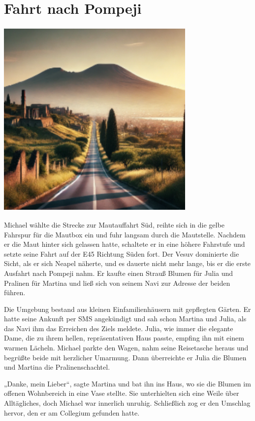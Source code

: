 \documentclass[
]{article}
\begin{document}
\section{Fahrt nach Pompeji}\label{fahrt-nach-pompeji}

\includegraphics[width=3.83373in,height=3.87746in]{media/image2.png}

Michael wählte die Strecke zur Mautauffahrt Süd, reihte sich in die
gelbe Fahrspur für die Mautbox ein und fuhr langsam durch die
Mautstelle. Nachdem er die Maut hinter sich gelassen hatte, schaltete er
in eine höhere Fahrstufe und setzte seine Fahrt auf der E45 Richtung
Süden fort. Der Vesuv dominierte die Sicht, als er sich Neapel näherte,
und es dauerte nicht mehr lange, bis er die erste Ausfahrt nach Pompeji
nahm. Er kaufte einen Strauß Blumen für Julia und Pralinen für Martina
und ließ sich von seinem Navi zur Adresse der beiden führen.

Die Umgebung bestand aus kleinen Einfamilienhäusern mit gepflegten
Gärten. Er hatte seine Ankunft per SMS angekündigt und sah schon Martina
und Julia, als das Navi ihm das Erreichen des Ziels meldete. Julia, wie
immer die elegante Dame, die zu ihrem hellen, repräsentativen Haus
passte, empfing ihn mit einem warmen Lächeln. Michael parkte den Wagen,
nahm seine Reisetasche heraus und begrüßte beide mit herzlicher
Umarmung. Dann überreichte er Julia die Blumen und Martina die
Pralinenschachtel.

„Danke, mein Lieber``, sagte Martina und bat ihn ins Haus, wo sie die
Blumen im offenen Wohnbereich in eine Vase stellte. Sie unterhielten
sich eine Weile über Alltägliches, doch Michael war innerlich unruhig.
Schließlich zog er den Umschlag hervor, den er am Collegium gefunden
hatte.
\end{document}
